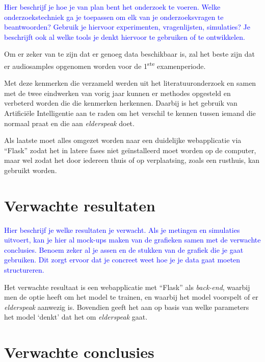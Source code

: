 \textcolor{blue}{Hier beschrijf je hoe je van plan bent het onderzoek te voeren. Welke onderzoekstechniek ga je toepassen om elk van je onderzoeksvragen te beantwoorden? Gebruik je hiervoor experimenten, vragenlijsten, simulaties? Je beschrijft ook al welke tools je denkt hiervoor te gebruiken of te ontwikkelen.}

Om er zeker van te zijn dat er genoeg data beschikbaar is, zal het beste zijn dat er audiosamples opgenomen worden voor de 1\textsuperscript{ste} examenperiode.

Met deze kenmerken die verzameld werden uit het literatuuronderzoek en samen met de twee eindwerken van vorig jaar kunnen er methodes opgesteld en verbeterd worden die die kenmerken herkennen.
Daarbij is het gebruik van Artificiële Intelligentie aan te raden om het verschil te kennen tussen iemand die normaal praat en die aan \textit{elderspeak} doet.

Als laatste moet alles omgezet worden naar een duidelijke webapplicatie via ``Flask'' zodat het in latere fases niet geïnstalleerd moet worden op de computer, maar wel zodat het door iedereen thuis of op verplaatsing, zoals een rusthuis, kan gebruikt worden.


\section{Verwachte resultaten}
\label{sec:verwachte_resultaten}

\textcolor{blue}{Hier beschrijf je welke resultaten je verwacht. Als je metingen en simulaties uitvoert, kan je hier al mock-ups maken van de grafieken samen met de verwachte conclusies. Benoem zeker al je assen en de stukken van de grafiek die je gaat gebruiken. Dit zorgt ervoor dat je concreet weet hoe je je data gaat moeten structureren.}

Het verwachte resultaat is een webapplicatie met ``Flask'' als \textit{back-end}, waarbij men de optie heeft om het model te trainen, en waarbij het model voorspelt of er \textit{elderspeak} aanwezig is. Bovendien geeft het aan op basis van welke parameters het model `denkt' dat het om \textit{elderspeak} gaat.


\section{Verwachte conclusies}
\label{sec:verwachte_conclusies}

